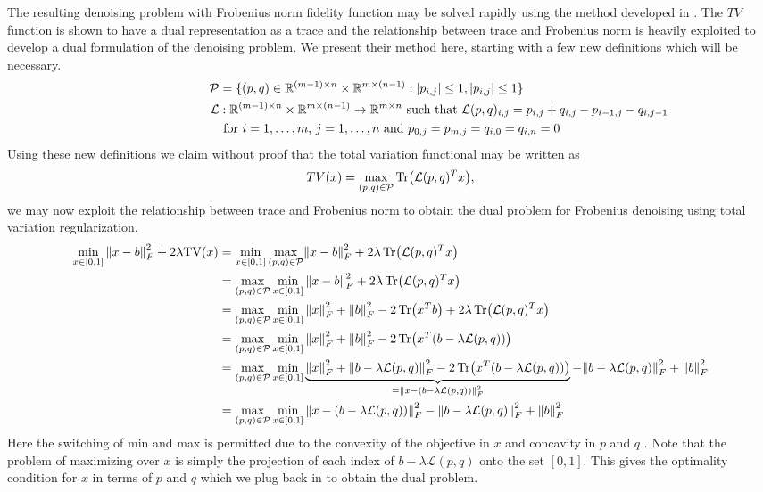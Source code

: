 \documentclass[10pt,a4paper]{article}
\newcommand{\R}{\mathbb{R}}
\begin{document}
	The resulting denoising problem with Frobenius norm fidelity function may be solved rapidly using the method developed in \cite{TV}.  The $TV$ function is shown to have a dual representation as a trace and the relationship between trace and Frobenius norm is heavily exploited to develop a dual formulation of the denoising problem.  We present their method here, starting with a few new definitions which will be necessary.
	\begin{align*}
	\mathcal{P} &= \{ (p,q) \in \R^{(m-1) \times n} \times \R^{ m \times (n-1) } :  \abs{p_{i,j} } \le 1, \abs{p_{ i,j } } \le 1 \} \\
	\mathcal{L} &: \R^{(m-1) \times n} \times \R^{ m \times (n-1) } \rightarrow \R^{m \times n}  \text{ such that } \mathcal{L}(p,q)_{i,j} = p_{i,j} + q_{i,j} - p_{ i-1,j } - q_{ i,j-1 }\\ \hspace{3 cm}& \text{ for } i = 1,\dots,m,\,j = 1,\dots,n \text{ and }  p_{0,j} = p_{m,j} = q_{i,0} = q_{i,n} = 0
	\end{align*}
	Using these new definitions we claim without proof that the total variation functional may be written as
	\begin{equation}
	TV(x) = \underset{(p,q) \in \mathcal{P}}{\max} \Tr(\mathcal{L}(p,q)^Tx),
	\end{equation}
	we may now exploit the relationship between trace and Frobenius norm to obtain the dual problem for Frobenius denoising using total variation regularization.  \\
	\begin{align*}
	\min_{x \in [0,1]} \norm{x-b}_F^2 +2 \lambda \mathrm{TV}(x) &= \min_{x \in [0,1]}  \underset{(p,q) \in \mathcal{P}}{\max}  \norm{x-b}_F^2 + 2\lambda \Tr(\mathcal{L}(p,q)^Tx) \\
	&= \underset{(p,q) \in \mathcal{P}}{\max}   \min_{x \in [0,1]} \norm{x-b}_F^2 +2 \lambda \Tr(\mathcal{L}(p,q)^Tx) \\
	&=\underset{(p,q) \in \mathcal{P}}{\max}   \min_{x \in [0,1]} \norm{x}_F^2 + \norm{b}_F^2 - 2 \Tr(x^Tb)+ 2\lambda \Tr(\mathcal{L}(p,q)^Tx) \\
	&=\underset{(p,q) \in \mathcal{P}}{\max}   \min_{x \in [0,1]} \norm{x}_F^2 + \norm{b}_F^2 - 2 \Tr(x^T(b- \lambda\mathcal{L}(p,q)))\\
	&=\underset{(p,q) \in \mathcal{P}}{\max}   \min_{x \in [0,1]} \underbrace{\norm{x}_F^2 + \norm{b- \lambda\mathcal{L}(p,q)}_F^2 - 2 \Tr(x^T(b- \lambda\mathcal{L}(p,q)))}_{ = \norm{x-(b- \lambda\mathcal{L}(p,q))}_F^2} -  \norm{b- \lambda\mathcal{L}(p,q)}_F^2+ \norm{b}_F^2\\
	&= \underset{(p,q) \in \mathcal{P}}{\max}   \min_{x \in [0,1]}  \norm{x-(b- \lambda\mathcal{L}(p,q))}_F^2 - \norm{b- \lambda\mathcal{L}(p,q)}_F^2+ \norm{b}_F^2 \\
	\end{align*}
	Here the switching of min and max is permitted due to the convexity of the objective in $x$ and concavity in $p$ and $q$ \cite{TV}.  Note that the problem of maximizing over $x$ is simply the projection of each index of  $b- \lambda\mathcal{L}(p,q)$ onto the set $[0,1]$.  This gives the optimality condition for $x$ in terms of $p$ and $q$ which we plug back in to obtain the dual problem.
	
\end{document}
